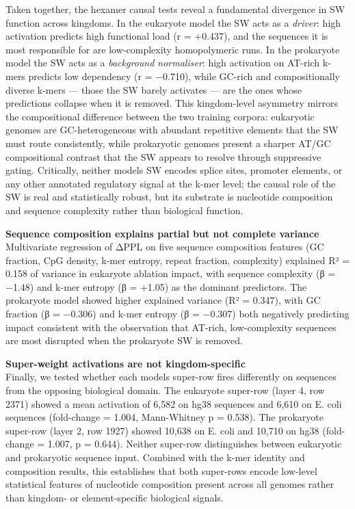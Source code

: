 \documentclass[11pt]{article}
\begin{document}
Taken together, the hexamer causal tests reveal a fundamental divergence
in SW function across kingdoms. In the eukaryote model the SW acts as a
\emph{driver}: high activation predicts high functional load (r =
+0.437), and the sequences it is most responsible for are low-complexity
homopolymeric runs. In the prokaryote model the SW acts as a
\emph{background normaliser}: high activation on AT-rich k-mers predicts
low dependency (r = −0.710), while GC-rich and compositionally diverse
k-mers --- those the SW barely activates --- are the ones whose
predictions collapse when it is removed. This kingdom-level asymmetry
mirrors the compositional difference between the two training corpora:
eukaryotic genomes are GC-heterogeneous with abundant repetitive
elements that the SW must route consistently, while prokaryotic genomes
present a sharper AT/GC compositional contrast that the SW appears to
resolve through suppressive gating. Critically, neither
model\textquotesingle s SW encodes splice sites, promoter elements, or
any other annotated regulatory signal at the k-mer level; the causal
role of the SW is real and statistically robust, but its substrate is
nucleotide composition and sequence complexity rather than biological
function.

\textbf{Sequence composition explains partial but not complete
variance}\\
Multivariate regression of ΔPPL on five sequence composition features
(GC fraction, CpG density, k-mer entropy, repeat fraction, complexity)
explained R² = 0.158 of variance in eukaryote ablation impact, with
sequence complexity (β = −1.48) and k-mer entropy (β = +1.05) as the
dominant predictors. The prokaryote model showed higher explained
variance (R² = 0.347), with GC fraction (β = −0.306) and k-mer entropy
(β = −0.307) both negatively predicting impact consistent with the
observation that AT-rich, low-complexity sequences are most disrupted
when the prokaryote SW is removed.

\textbf{Super-weight activations are not kingdom-specific}\\
Finally, we tested whether each model\textquotesingle s super-row fires
differently on sequences from the opposing biological domain. The
eukaryote super-row (layer 4, row 2371) showed a mean activation of
6,582 on hg38 sequences and 6,610 on E. coli sequences (fold-change =
1.004, Mann-Whitney p = 0.538). The prokaryote super-row (layer 2, row
1927) showed 10,638 on E. coli and 10,710 on hg38 (fold-change = 1.007,
p = 0.644). Neither super-row distinguishes between eukaryotic and
prokaryotic sequence input. Combined with the k-mer identity and
composition results, this establishes that both super-rows encode
low-level statistical features of nucleotide composition present across
all genomes rather than kingdom- or element-specific biological signals.
\end{document}
